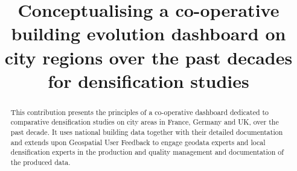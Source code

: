 \documentclass[agile, final]{copernicus-agile}
\begin{document}
\title{Conceptualising a co-operative building evolution dashboard on city regions over the past decades for densification studies}







\maketitle

\begin{abstract}
This contribution presents the principles of a co-operative dashboard dedicated to comparative densification studies on city areas in France, Germany and UK, over the past decade. It uses national building data together with their detailed documentation and extends upon Geospatial User Feedback to engage geodata experts and local densification experts in the production and quality management and documentation of the produced data.
\end{abstract}


\introduction
\label{intro}

\end{document}
